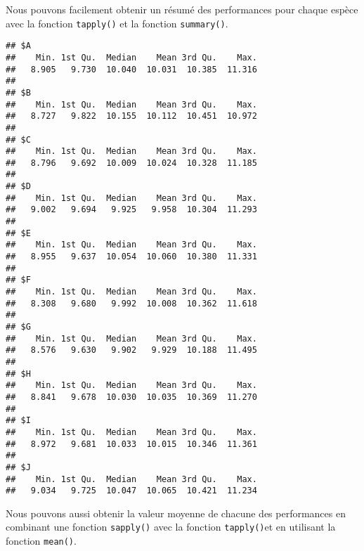 \documentclass[]{book}
\newenvironment{Shaded}{\begin{snugshade}}{\end{snugshade}}
\newcommand{\KeywordTok}[1]{\textcolor[rgb]{0.13,0.29,0.53}{\textbf{#1}}}
\newcommand{\DataTypeTok}[1]{\textcolor[rgb]{0.13,0.29,0.53}{#1}}
\newcommand{\DecValTok}[1]{\textcolor[rgb]{0.00,0.00,0.81}{#1}}
\newcommand{\ControlFlowTok}[1]{\textcolor[rgb]{0.13,0.29,0.53}{\textbf{#1}}}
\newcommand{\OperatorTok}[1]{\textcolor[rgb]{0.81,0.36,0.00}{\textbf{#1}}}
\newcommand{\NormalTok}[1]{#1}
\theoremstyle{definition}
\theoremstyle{definition}
\theoremstyle{definition}
\theoremstyle{remark}
\begin{document}
Nous pouvons facilement obtenir un résumé des performances pour chaque
espèce avec la fonction \texttt{tapply()} et la fonction
\texttt{summary()}.

\begin{Shaded}
\end{Shaded}

\begin{verbatim}
## $A
##    Min. 1st Qu.  Median    Mean 3rd Qu.    Max. 
##   8.905   9.730  10.040  10.031  10.385  11.316 
## 
## $B
##    Min. 1st Qu.  Median    Mean 3rd Qu.    Max. 
##   8.727   9.822  10.155  10.112  10.451  10.972 
## 
## $C
##    Min. 1st Qu.  Median    Mean 3rd Qu.    Max. 
##   8.796   9.692  10.009  10.024  10.328  11.185 
## 
## $D
##    Min. 1st Qu.  Median    Mean 3rd Qu.    Max. 
##   9.002   9.694   9.925   9.958  10.304  11.293 
## 
## $E
##    Min. 1st Qu.  Median    Mean 3rd Qu.    Max. 
##   8.955   9.637  10.054  10.060  10.380  11.331 
## 
## $F
##    Min. 1st Qu.  Median    Mean 3rd Qu.    Max. 
##   8.308   9.680   9.992  10.008  10.362  11.618 
## 
## $G
##    Min. 1st Qu.  Median    Mean 3rd Qu.    Max. 
##   8.576   9.630   9.902   9.929  10.188  11.495 
## 
## $H
##    Min. 1st Qu.  Median    Mean 3rd Qu.    Max. 
##   8.841   9.678  10.030  10.035  10.369  11.270 
## 
## $I
##    Min. 1st Qu.  Median    Mean 3rd Qu.    Max. 
##   8.972   9.681  10.033  10.015  10.346  11.361 
## 
## $J
##    Min. 1st Qu.  Median    Mean 3rd Qu.    Max. 
##   9.034   9.725  10.047  10.065  10.421  11.234
\end{verbatim}

Nous pouvons aussi obtenir la valeur moyenne de chacune des performances
en combinant une fonction \texttt{sapply()} avec la fonction
\texttt{tapply()}et en utilisant la fonction \texttt{mean()}.

\begin{Shaded}
\end{Shaded}
\end{document}
